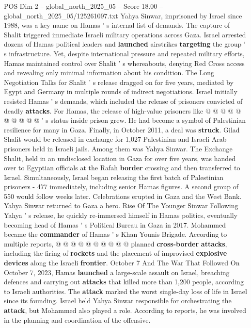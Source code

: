 \begin{textsample}{POS Dim 2 – global\_north\_2025\_05 – Score 18.00 – global\_north\_2025\_05/125261097.txt}
Yahya Sinwar, imprisoned by Israel since 1988, was a key name on Hamas ' s internal list of demands.
The capture of Shalit triggered immediate Israeli military operations across Gaza.
Israel arrested dozens of Hamas political leaders and \textbf{launched} airstrikes \textbf{targeting} the group ' s infrastructure.
Yet, despite international pressure and repeated military efforts, Hamas maintained control over Shalit ' s whereabouts, denying Red Cross access and revealing only minimal information about his condition.
The Long Negotiation Talks for Shalit ' s release dragged on for five years, mediated by Egypt and Germany in multiple rounds of indirect negotiations.
Israel initially resisted Hamas ' s demands, which included the release of prisoners convicted of deadly \textbf{attacks}.
For Hamas, the release of high-value prisoners like @ @ @ @ @ @ @ @ @ @ ' s status inside prison grew.
He had become a symbol of Palestinian resilience for many in Gaza.
Finally, in October 2011, a deal was \textbf{struck}.
Gilad Shalit would be released in exchange for 1,027 Palestinian and Israeli Arab prisoners held in Israeli jails.
Among them was Yahya Sinwar.
The Exchange Shalit, held in an undisclosed location in Gaza for over five years, was handed over to Egyptian officials at the Rafah \textbf{border} crossing and then transferred to Israel.
Simultaneously, Israel began releasing the first batch of Palestinian prisoners - 477 immediately, including senior Hamas figures.
A second group of 550 would follow weeks later.
Celebrations erupted in Gaza and the West Bank.
Yahya Sinwar returned to Gaza a hero.
Rise Of The Younger Sinwar Following Yahya ' s release, he quickly re-immersed himself in Hamas politics, eventually becoming head of Hamas ' s Political Bureau in Gaza in 2017.
Mohammed became the \textbf{commander} of Hamas ' s Khan Younis Brigade.
According to multiple reports, @ @ @ @ @ @ @ @ @ @ planned \textbf{cross-border} \textbf{attacks}, including the firing of \textbf{rockets} and the placement of improvised \textbf{explosive} \textbf{devices} along the Israeli \textbf{frontier}.
October 7 And The War That Followed On October 7, 2023, Hamas \textbf{launched} a large-scale assault on Israel, breaching defences and carrying out \textbf{attacks} that killed more than 1,200 people, according to Israeli authorities.
The \textbf{attack} marked the worst single-day loss of life in Israel since its founding.
Israel held Yahya Sinwar responsible for orchestrating the \textbf{attack}, but Mohammed also played a role.
According to reports, he was involved in the planning and coordination of the offensive.

\end{textsample}
